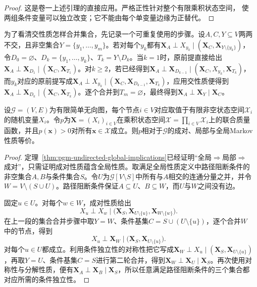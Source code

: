\begin{proof}
这是卷一上述引理的直接应用。严格正性针对整个有限乘积状态空间，
使两组条件变量可以独立改变；它不能由每个单变量边缘为正替代。
\end{proof}

为了看清交性质怎样合并集合，先记录一个可重复使用的步骤。设$A,C,Y\subseteq V$两两不交，且非空集合$Y=\{y_1,\ldots,y_m\}$。若对每个$y_k$都有$\bm{X}_A\perp X_{y_k}\mid(\bm{X}_C,\bm{X}_{Y\setminus\{y_k\}})$，令$D_0=\varnothing$、$D_k=\{y_1,\ldots,y_k\}$、$T_k=Y\setminus D_k$。当$k=1$时，原前提直接给出$\bm{X}_A\perp\bm{X}_{D_1}\mid(\bm{X}_C,\bm{X}_{T_1})$。对$k\geq2$，若已经得到$\bm{X}_A\perp\bm{X}_{D_{k-1}}\mid(\bm{X}_C,X_{y_k},\bm{X}_{T_k})$，而$y_k$对应的原前提写成$\bm{X}_A\perp X_{y_k}\mid(\bm{X}_C,\bm{X}_{D_{k-1}},\bm{X}_{T_k})$，应用交性质便得到$\bm{X}_A\perp\bm{X}_{D_k}\mid(\bm{X}_C,\bm{X}_{T_k})$。逐个合并到$T_m=\varnothing$，最终得到$\bm{X}_A\perp\bm{X}_Y\mid\bm{X}_C$。

\begin{theorem}[严格正条件下三种Markov性质等价]
  \label{thm:pgm-undirected-markov-equivalence}
  设$\mathcal{G}=(V,E)$为有限简单无向图，每个节点$i\in V$对应取值于有限非空状态空间$\mathcal{X}_i$的随机变量$X_i$。令$p$为$\bm{X}=(X_i)_{i\in V}$在乘积状态空间$\mathcal{X}=\prod_{i\in V}\mathcal{X}_i$上的联合质量函数，并且$p(\bm{x})>0$对所有$\bm{x}\in\mathcal{X}$成立。则$p$相对于$\mathcal{G}$的成对、局部与全局Markov性质等价。
\end{theorem}

\begin{proof}
定理~\ref{thm:pgm-undirected-global-implications}已经证明“全局$\Rightarrow$局部$\Rightarrow$成对”，只需证明成对性质蕴含全局性质。取满足全局性质定义中路径阻断条件的非空集合$A,B$与条件集合$S$。令$U$为$\mathcal{G}[V\setminus S]$中所有与$A$相交的连通分量之并，并令$W=V\setminus(S\cup U)$。路径阻断条件保证$A\subseteq U$、$B\subseteq W$，而$U$与$W$之间没有边。

固定$u\in U$。对每个$w\in W$，成对性质给出
\[
  X_u\perp X_w
  \mid
  \bigl(\bm{X}_S,\bm{X}_{U\setminus\{u\}},
        \bm{X}_{W\setminus\{w\}}\bigr).
\]
在上一段的集合合并步骤中取$Y=W$、条件基集$C=S\cup(U\setminus\{u\})$，逐个合并$W$中的节点，得到
\[
  X_u\perp\bm{X}_W
  \mid\bigl(\bm{X}_S,\bm{X}_{U\setminus\{u\}}\bigr).
\]
对每个$u\in U$都成立。利用条件独立性的对称性把它写成$\bm{X}_W\perp X_u\mid(\bm{X}_S,\bm{X}_{U\setminus\{u\}})$，再取$Y=U$、条件基集$C=S$进行第二轮合并，得到$\bm{X}_W\perp\bm{X}_U\mid\bm{X}_S$。再次使用对称性与分解性质，便有$\bm{X}_A\perp\bm{X}_B\mid\bm{X}_S$，所以任意满足路径阻断条件的三个集合都对应所需的条件独立性。
\end{proof}


